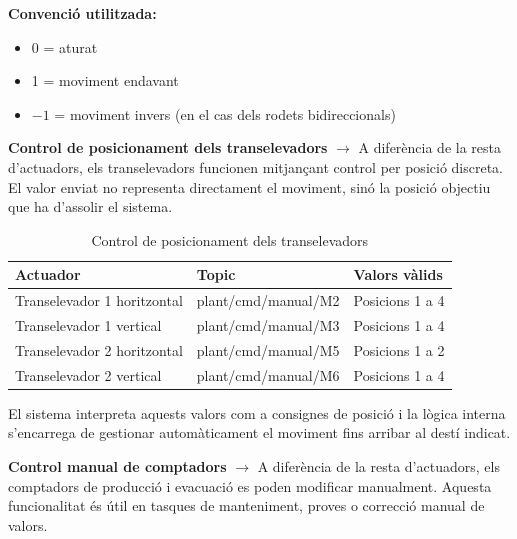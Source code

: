 \documentclass[a4paper,11pt,DIV=13,headings=normal,abstract=true,twoside=semi]{article}
\begin{document}
\textbf{Convenció utilitzada:}

\begin{itemize}
\item 0 = aturat
\item 1 = moviment endavant
\item $-1$ = moviment invers (en el cas dels rodets bidireccionals)
\end{itemize}

\textbf{Control de posicionament dels transelevadors} $\rightarrow$ A diferència de la resta d'actuadors, els transelevadors funcionen mitjançant control per posició discreta. El valor enviat no representa directament el moviment, sinó la posició objectiu que ha d'assolir el sistema.

\begin{table}[H]
\centering
\small
\caption{Control de posicionament dels transelevadors}
\label{tab:mqtt_asrs}
\begin{tabular}{|p{4cm}|p{4cm}|p{5cm}|}
\hline
\textbf{Actuador} & \textbf{Topic} & \textbf{Valors vàlids} \\ \hline

Transelevador 1 horitzontal & plant/cmd/manual/M2 & Posicions 1 a 4 \\ \hline

Transelevador 1 vertical & plant/cmd/manual/M3 & Posicions 1 a 4 \\ \hline

Transelevador 2 horitzontal & plant/cmd/manual/M5 & Posicions 1 a 2 \\ \hline

Transelevador 2 vertical & plant/cmd/manual/M6 & Posicions 1 a 4 \\ \hline

\end{tabular}

\end{table}

El sistema interpreta aquests valors com a consignes de posició i la lògica interna s'encarrega de gestionar automàticament el moviment fins arribar al destí indicat.

\textbf{Control manual de comptadors} $\rightarrow$ A diferència de la resta d'actuadors, els comptadors de producció i evacuació es poden modificar manualment. Aquesta funcionalitat és útil en tasques de manteniment, proves o correcció manual de valors.
\end{document}
